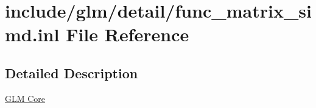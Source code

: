 \hypertarget{func__matrix__simd_8inl}{}\section{include/glm/detail/func\+\_\+matrix\+\_\+simd.inl File Reference}
\label{func__matrix__simd_8inl}


\subsection{Detailed Description}
\hyperlink{group__core}{G\+LM Core} 
